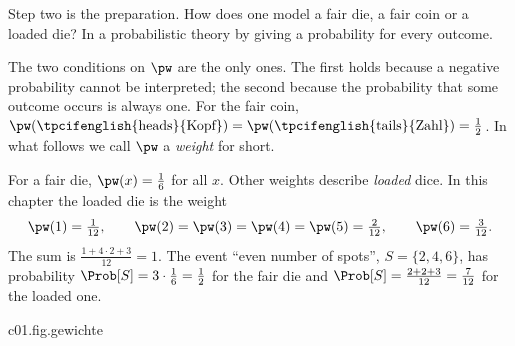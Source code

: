 Step two is the preparation. How does one model a fair die, a fair coin or a loaded die?
In a probabilistic theory by giving a probability for every outcome.


The two conditions on $\pw$ are the only ones. The first holds because a negative
probability cannot be interpreted; the second because the probability that some outcome
occurs is always one. For the fair coin,
$\pw(\text{\tpcifenglish{heads}{Kopf}}) = \pw(\text{\tpcifenglish{tails}{Zahl}}) = \tfrac12$.
In what follows we call $\pw$ a \emph{weight} for short.

\begin{example}\label{c01.ex.gezinkt}
  For a fair die, $\pw(x) = \tfrac16$ for all $x$. Other weights describe \emph{loaded}
  dice. In this chapter the loaded die is the weight
  \begin{equation}\label{c01.eq.gezinkt}
    \pw(1) = \tfrac{1}{12}, \qquad
    \pw(2) = \pw(3) = \pw(4) = \pw(5) = \tfrac{2}{12}, \qquad
    \pw(6) = \tfrac{3}{12} .
  \end{equation}
  The sum is $\tfrac{1 + 4\cdot 2 + 3}{12} = 1$. The event “even number of spots”,
  $S = \{2,4,6\}$, has probability
  $\Prob[S] = 3\cdot\tfrac16 = \tfrac12$ for the fair die and
  $\Prob[S] = \tfrac{2 + 2 + 3}{12} = \tfrac{7}{12}$ for the loaded one.
\end{example}

\begin{tpcfigure}{c01.fig.gewichte}

  \caption{Three weights on the outcome set $\{1, \dots, 6\}$ of a die. The height of a bar
    is $\pw(x)$; in each picture the sum of all heights is $1$. (a) Fair die. (b) The
    loaded die of equation~\eqref{c01.eq.gezinkt}. (c) A point weight: the whole weight
    lies on the outcome $3$. Such weights describe deterministic preparations
    (Proposition~\ref{c01.prop.punktgewicht}).}
\end{tpcfigure}

